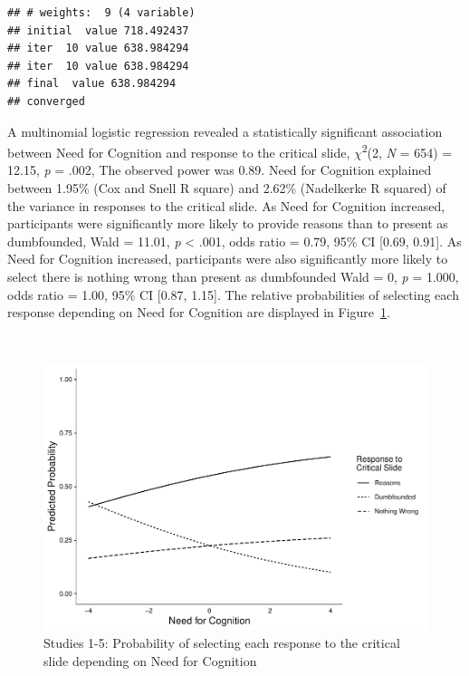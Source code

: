 \documentclass[
  american,
  man,floatsintext]{apa7}
\begin{document}
\begin{verbatim}
## # weights:  9 (4 variable)
## initial  value 718.492437 
## iter  10 value 638.984294
## iter  10 value 638.984294
## final  value 638.984294 
## converged
\end{verbatim}

\newpage

A multinomial logistic regression revealed a statistically significant association between Need for Cognition and response to the critical slide, \(\chi\)\textsuperscript{2}(2, \emph{N} = 654) = 12.15, \emph{p} = .002, The observed
power was 0.89. Need for Cognition explained between 1.95\% (Cox and Snell R square) and 2.62\% (Nadelkerke R squared) of the variance in responses to the critical slide. As Need for Cognition increased, participants were significantly more likely to provide reasons than to present as dumbfounded, Wald = 11.01, \emph{p} \textless{} .001, odds ratio = 0.79, 95\% CI {[}0.69, 0.91{]}. As Need for Cognition increased, participants were also significantly more likely to select there is nothing wrong than present as dumbfounded Wald = 0, \emph{p} = 1.000, odds ratio = 1.00, 95\% CI {[}0.87, 1.15{]}. The relative probabilities of selecting each response depending on Need for Cognition are displayed in Figure~\ref{fig:ggplotlogitall}.

\newpage

~

\begin{figure}
\centering
\includegraphics{Combined_analyses_files/figure-latex/ggplotlogitall-1.pdf}
\caption{\label{fig:ggplotlogitall}Studies 1-5: Probability of selecting each response to the critical slide depending on Need for Cognition}
\end{figure}

\newpage
\end{document}
